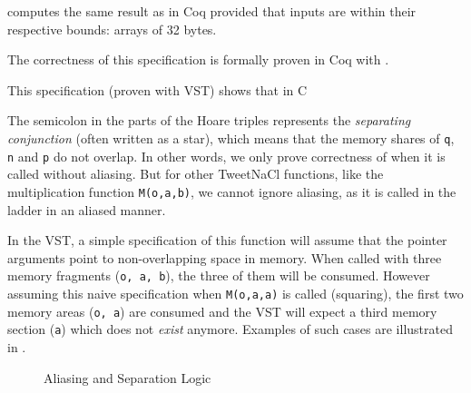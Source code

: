 computes the same result as  in Coq provided that inputs are within
their respective bounds: arrays of 32 bytes.

The correctness of this specification is formally proven in Coq with
.

\begin{sloppypar}
This specification (proven with VST) shows that  in C
\end{sloppypar}



%
The semicolon in the  parts of the Hoare triples represents the \emph{separating conjunction} (often written as a star), which means that
the memory shares of \texttt{q}, \texttt{n} and \texttt{p} do not overlap.
In other words,
we only prove correctness of  when it is called without aliasing.
But for other TweetNaCl functions, like the multiplication function \texttt{M(o,a,b)}, we cannot ignore aliasing, as it is called in the ladder in an aliased manner.

In the VST, a simple specification of this function will assume that the pointer arguments
point to non-overlapping space in memory.
When called with three memory fragments (\texttt{o, a, b}),
the three of them will be consumed. However assuming this naive specification
when \texttt{M(o,a,a)} is called (squaring), the first two memory areas (\texttt{o, a})
are consumed and the VST will expect a third memory section (\texttt{a}) which does not \emph{exist} anymore.
Examples of such cases are illustrated in .
\begin{figure}[h]%
  \centering%
  \caption{Aliasing and Separation Logic}%
  \label{tikz:MemSame}%
\end{figure}

